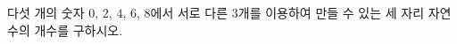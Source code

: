 \hspace*{2mm}\begin{minipage}[t]{\dimexpr\linewidth-2mm\relax}\vspace{0pt}
다섯 개의 숫자 $0$, $2$, $4$, $6$, $8$에서 서로 다른 $3$개를 이용하여 만들 수 있는 세 자리 자연수의 개수를 구하시오.\end{minipage}
